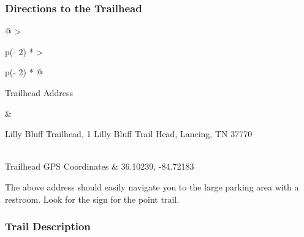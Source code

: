 \documentclass[
  letterpaper,
  DIV=11,
  numbers=noendperiod]{scrartcl}
\begin{document}
\hypertarget{directions-to-the-trailhead-13}{%
\subsubsection{Directions to the
Trailhead}\label{directions-to-the-trailhead-13}}

\begin{longtable}[]{@{}
  >{\raggedright\arraybackslash}p{(\columnwidth - 2\tabcolsep) * }
  >{\raggedright\arraybackslash}p{(\columnwidth - 2\tabcolsep) * }@{}}
\toprule\noalign{}
\begin{minipage}[b]{\linewidth}\raggedright
Trailhead Address
\end{minipage} & \begin{minipage}[b]{\linewidth}\raggedright
Lilly Bluff Trailhead, 1 Lilly Bluff Trail Head, Lancing, TN 37770
\end{minipage} \\
\midrule\noalign{}
\endhead
\bottomrule\noalign{}
\endlastfoot
Trailhead GPS Coordinates & 36.10239, -84.72183 \\
\end{longtable}

The above address should easily navigate you to the large parking area
with a restroom. Look for the sign for the point trail.

\hypertarget{trail-description-13}{%
\subsubsection{Trail Description}\label{trail-description-13}}
\end{document}
